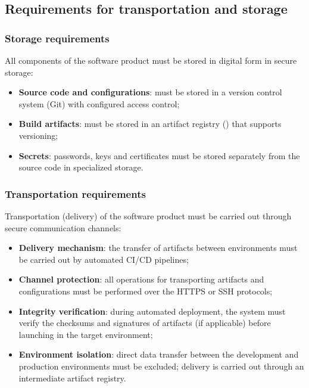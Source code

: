 \documentclass[12pt,a4paper]{extarticle}
\begin{document}
\subsection{Requirements for transportation and storage}

\subsubsection{Storage requirements}

\begin{hseExample}
All components of the software product must be stored in digital form in secure storage:
\begin{itemize}[nosep, leftmargin=1.25cm]
    \item \textbf{Source code and configurations}: must be stored in a version control system (Git) with configured access control;
    \item \textbf{Build artifacts}: must be stored in an artifact registry () that supports versioning;
    \item \textbf{Secrets}: passwords, keys and certificates must be stored separately from the source code in specialized storage.
\end{itemize}
\end{hseExample}

\subsubsection{Transportation requirements}

\begin{hseExample}
Transportation (delivery) of the software product must be carried out through secure communication channels:
\begin{itemize}[nosep, leftmargin=1.25cm]
    \item \textbf{Delivery mechanism}: the transfer of artifacts between environments must be carried out by automated CI/CD pipelines;
    \item \textbf{Channel protection}: all operations for transporting artifacts and configurations must be performed over the HTTPS or SSH protocols;
    \item \textbf{Integrity verification}: during automated deployment, the system must verify the checksums and signatures of artifacts (if applicable) before launching in the target environment;
    \item \textbf{Environment isolation}: direct data transfer between the development and production environments must be excluded; delivery is carried out through an intermediate artifact registry.
\end{itemize}
\end{hseExample}
\end{document}
